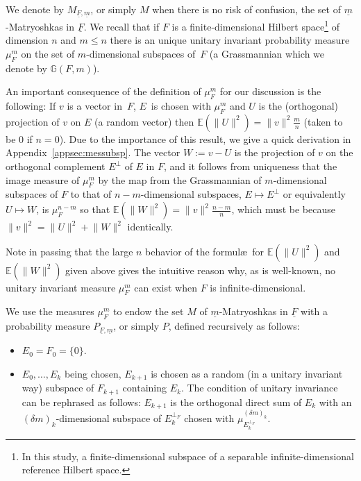 \documentclass[pdftex]{sigma}%
\newcommand{\norm}[1]{\lVert #1\rVert}
\newcommand{\perpF}{{\perp _F}}
\newcommand{\expec}[1]{\mathbb{E}\left(#1\right)}
\begin{document}
We denote by $M_{\underline{F},\underline{m}}$, or simply $M$ when there is no risk of confusion, the set of $\underline{m}$-Matryoshkas in $\underline{F}$.
We recall that if $F$ is a finite-dimensional Hilbert space\footnote{In this study, a finite-dimensional subspace of a separable infinite-dimensional reference Hilbert space.} of dimension $n$ and $m\leq n$ there is an unique unitary invariant probability measure $\mu_F^m$ on the set of $m$-dimensional subspaces of~$F$ (a Grassmannian which we denote by $\mathbb{G}(F,m)$).

An important consequence of the definition of $\mu_F^m$ for our discussion is the following: If $v$ is a vector in~$F$, $E$~is chosen with $\mu_F^m$ and $U$ is the (orthogonal) projection of $v$ on $E$ (a random vector) then $\expec{\norm{U}^2}=\norm{v}^2\frac{m}{n}$ (taken to be $0$ if $n=0$). Due to the importance of this result, we give a quick derivation in Appendix~\ref{appsec:messubsp}. The vector $W:=v-U$ is the projection of $v$ on the orthogonal complement $E^\perp$ of $E$ in $F$, and it follows from uniqueness that the image measure of $\mu_F^m$ by the map from the Grassmannian of $m$-dimensional subspaces of $F$ to that of $n-m$-dimensional subspaces, $E\mapsto E^\perp$ or equivalently $U \mapsto W$, is $\mu_F^{n-m}$ so that $\expec{\norm{W}^2}=\norm{v}^2\frac{n-m}{n}$, which must be because $\norm{v}^2=\norm{U}^2+\norm{W}^2$ identically.

Note in passing that the large $n$ behavior of the formul\ae\ for $\expec{\norm{U}^2}$ and $\expec{\norm{W}^2}$ given above gives the intuitive reason why, as is well-known, no unitary invariant measure $\mu_F^m$ can exist when $F$ is infinite-dimensional.

We use the measures $\mu_F^m$ to endow the set $M$ of $\underline{m}$-Matryoshkas in $\underline{F}$ with a probability measure $P_{\underline{F},\underline{m}}$, or simply $P$, defined recursively as follows:
\begin{itemize}\itemsep=0pt
\item $E_0=F_0=\{0\}$.
\item $E_0,\dots,E_k$ being chosen, $E_{k+1}$ is chosen as a random (in a unitary invariant way) subspace of $F_{k+1}$ containing $E_k$. The condition of unitary invariance can be rephrased as follows: $E_{k+1}$ is the orthogonal direct sum of $E_k$ with an $(\delta m)_k$-dimensional subspace of $E_k^\perpF$ chosen with $\mu_{E_k^\perpF}^{(\delta m)_k}$.
\end{itemize}
\end{document}
